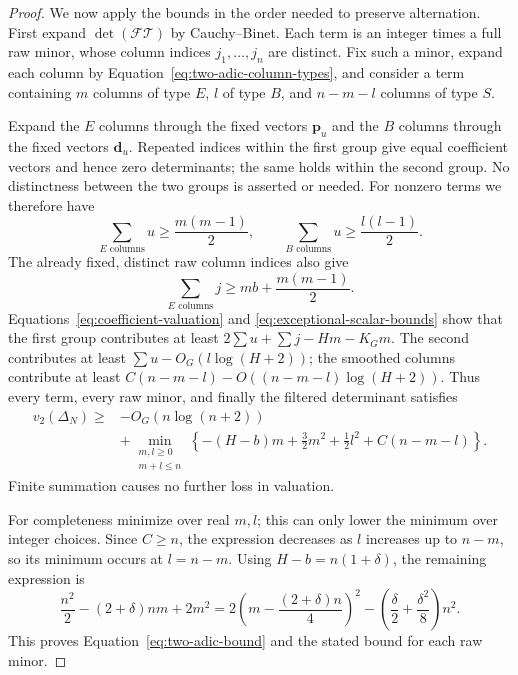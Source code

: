 \begin{proof}
We now apply the bounds in the order needed to preserve alternation.
First expand $\det(\mathcal F\mathcal T)$ by Cauchy--Binet.
Each term is an integer times a full raw minor, whose column indices
$j_1,\ldots,j_n$ are distinct. Fix such a minor, expand each column
by Equation~\eqref{eq:two-adic-column-types}, and consider a term
containing $m$ columns of type $E$, $l$ of type $B$, and $n-m-l$
columns of type $S$.

Expand the $E$ columns through the fixed vectors $\mathbf p_u$ and
the $B$ columns through the fixed vectors $\mathbf d_u$.
Repeated indices within the first group give equal coefficient vectors
and hence zero determinants; the same holds within the second group.
No distinctness between the two groups is asserted or needed.
For nonzero terms we therefore have
\[
\sum_{E\text{ columns}}u\ge\frac{m(m-1)}2,\qquad
\sum_{B\text{ columns}}u\ge\frac{l(l-1)}2.
\]
The already fixed, distinct raw column indices also give
\[
\sum_{E\text{ columns}}j\ge mb+\frac{m(m-1)}2.
\]
Equations~\eqref{eq:coefficient-valuation} and
\eqref{eq:exceptional-scalar-bounds} show that the first group contributes
at least $2\sum u+\sum j-Hm-K_Gm$.
The second contributes at least $\sum u-O_G(l\log(H+2))$;
the smoothed columns contribute at least
$C(n-m-l)-O((n-m-l)\log(H+2))$.
Thus every term, every raw minor, and finally the filtered determinant
satisfies
\begin{equation}\label{eq:two-adic-quadratic}
\begin{split}
v_2(\Delta_N)\ge{}&-O_G(n\log(n+2))\\
&+\min_{\substack{m,l\ge0\\m+l\le n}}
\left\{-(H-b)m+\frac32m^2+\frac12l^2+C(n-m-l)\right\}.
\end{split}
\end{equation}
Finite summation causes no further loss in valuation.

For completeness minimize over real $m,l$; this can only lower the
minimum over integer choices. Since $C\ge n$, the expression decreases
as $l$ increases up to $n-m$, so its minimum occurs at $l=n-m$.
Using $H-b=n(1+\delta)$, the remaining expression is
\[
\frac{n^2}{2}-(2+\delta)nm+2m^2
=2\left(m-\frac{(2+\delta)n}{4}\right)^2
 -\left(\frac\delta2+\frac{\delta^2}{8}\right)n^2.
\]
This proves Equation~\eqref{eq:two-adic-bound} and the stated
bound for each raw minor.
\end{proof}

